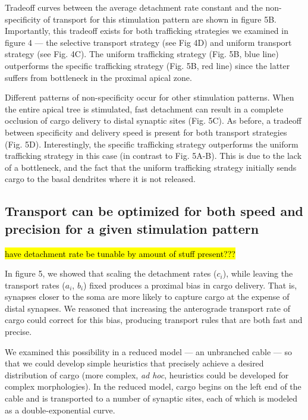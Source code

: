 \documentclass[10pt]{wlpeerj}
\begin{document}
Tradeoff curves between the average detachment rate constant and the non-specificity of transport for this stimulation pattern are shown in figure 5B.
Importantly, this tradeoff exists for both trafficking strategies we examined in figure 4 --- the selective transport strategy (see Fig 4D) and uniform transport strategy (see Fig. 4C).
The uniform trafficking strategy (Fig. 5B, blue line) outperforms the specific trafficking strategy (Fig. 5B, red line) since the latter suffers from bottleneck in the proximal apical zone.

Different patterns of non-specificity occur for other stimulation patterns.
When the entire apical tree is stimulated, fast detachment can result in a complete occlusion of cargo delivery to distal synaptic sites (Fig. 5C).
As before, a tradeoff between specificity and delivery speed is present for both transport strategies (Fig. 5D).
Interestingly, the specific trafficking strategy outperforms the uniform trafficking strategy in this case (in contrast to Fig. 5A-B).
This is due to the lack of a bottleneck, and the fact that the uniform trafficking strategy initially sends cargo to the basal dendrites where it is not released.

\subsection*{Transport can be optimized for both speed and precision for a given stimulation pattern}

\hl{have detachment rate be tunable by amount of stuff present???}

In figure 5, we showed that scaling the detachment rates ($c_i$), while leaving the transport rates ($a_i$, $b_i$) fixed produces a proximal bias in cargo delivery.
That is, synapses closer to the soma are more likely to capture cargo at the expense of distal synapses.
We reasoned that increasing the anterograde transport rate of cargo could correct for this bias, producing transport rules that are both fast and precise.

We examined this possibility in a reduced model --- an unbranched cable --- so that we could develop simple heuristics that precisely achieve a desired distribution of cargo (more complex, \textit{ad hoc}, heuristics could be developed for complex morphologies).
In the reduced model, cargo begins on the left end of the cable and is transported to a number of synaptic sites, each of which is modeled as a double-exponential curve.
\end{document}

